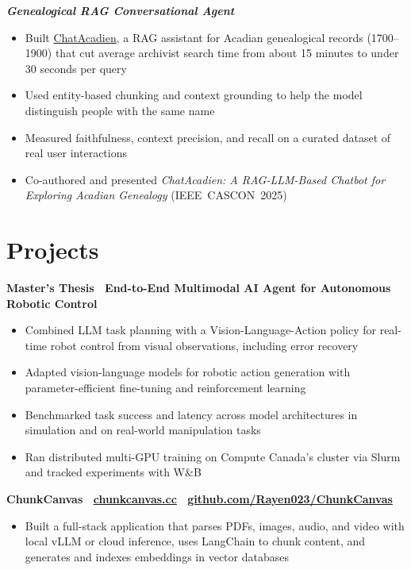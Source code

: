 \documentclass[letterpaper,10pt]{article}
\newcommand{\resumeItem}[1]{\item #1}
\newcommand{\resumeProjectHeading}[1]{
  \par\addvspace{5pt}\noindent\textbf{#1}\par\nopagebreak
}
\newcommand{\resumeResearchProjectHeading}[1]{
  \par\addvspace{4pt}\noindent\textbf{\textit{#1}}\par\nopagebreak
}
\newcommand{\resumeItemListStart}{\begin{itemize}[label=\textbullet, leftmargin=1.4em, itemsep=1pt, topsep=2pt, parsep=0pt, partopsep=0pt]}
\newcommand{\resumeItemListEnd}{\end{itemize}}
\begin{document}
\resumeResearchProjectHeading{Genealogical RAG Conversational Agent}
\resumeItemListStart
\resumeItem{Built \href{https://chatacadien.ca}{ChatAcadien}, a RAG assistant for Acadian genealogical records (1700--1900) that cut average archivist search time from about 15 minutes to under 30 seconds per query}
\resumeItem{Used entity-based chunking and context grounding to help the model distinguish people with the same name}
\resumeItem{Measured faithfulness, context precision, and recall on a curated dataset of real user interactions}
\resumeItem{Co-authored and presented \textit{ChatAcadien: A RAG-LLM-Based Chatbot for Exploring Acadian Genealogy} \mbox{(IEEE CASCON 2025)}}
\resumeItemListEnd

\section{Projects}
\resumeProjectHeading{Master's Thesis \textnormal{\textbar\ End-to-End Multimodal AI Agent for Autonomous Robotic Control}}
\resumeItemListStart
\resumeItem{Combined LLM task planning with a Vision-Language-Action policy for real-time robot control from visual observations, including error recovery}
\resumeItem{Adapted vision-language models for robotic action generation with parameter-efficient fine-tuning and reinforcement learning}
\resumeItem{Benchmarked task success and latency across model architectures in simulation and on real-world manipulation tasks}
\resumeItem{Ran distributed multi-GPU training on Compute Canada's cluster via Slurm and tracked experiments with W\&B}
\resumeItemListEnd

\resumeProjectHeading{ChunkCanvas \textnormal{\textbar\ \href{https://chunkcanvas.cc}{chunkcanvas.cc} \textbar\ \href{https://github.com/Rayen023/ChunkCanvas}{github.com/Rayen023/ChunkCanvas}}}
\resumeItemListStart
\resumeItem{Built a full-stack application that parses PDFs, images, audio, and video with local vLLM or cloud inference, uses LangChain to chunk content, and generates and indexes embeddings in vector databases}
\resumeItemListEnd
\end{document}
